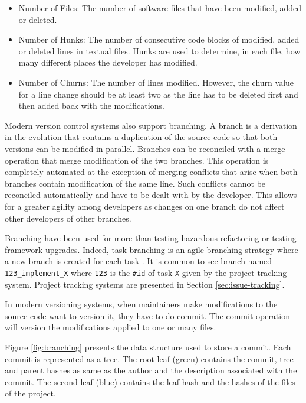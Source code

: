 \begin{itemize}
\item Number of Files: The number of software files that have been modified, added or deleted.
\item Number of Hunks: The number of consecutive code blocks of modified, added or deleted lines in textual files. Hunks are used to determine, in each file, how many different places the developer has modified.
\item Number of Churns:  The number of lines modified. However, the churn value for a line change should be at least two as the line has to be deleted first and then added back with the modifications.
\end{itemize}

Modern version control systems also support branching.
A branch is a derivation in the evolution that contains a duplication of the source code so that both versions can be modified in parallel.
Branches can be reconciled with a merge operation that merge modification of the two branches.
This operation is completely automated at the exception of merging conflicts that arise when both branches contain modification of the same line.
Such conflicts cannot be reconciled automatically and have to be dealt with by the developer.
This allows for a greater agility among developers as changes on one branch do not affect other developers of other branches.

Branching have been used for more than testing hazardous refactoring or testing framework upgrades.
Indeed, task branching is an agile branching strategy where a new branch is created for each task \cite{MartinFowler2009}.
It is common to see branch named {\tt 123\_implement\_X} where {\tt 123} is the {\tt \#id} of task {\tt X} given by the project tracking system.
Project tracking systems are presented in Section \ref{sec:issue-tracking}.

In modern versioning systems, when maintainers make modifications to the source code want to version it, they have to do commit.
The commit operation will version the modifications applied to one or many files.

Figure \ref{fig:branching} presents the data structure used to store a commit.
Each commit is represented as a tree.
The root leaf (green) contains the commit, tree and parent hashes as same as the author and the description associated with the commit.
The second leaf (blue) contains the leaf hash and the hashes of the files of the project.

